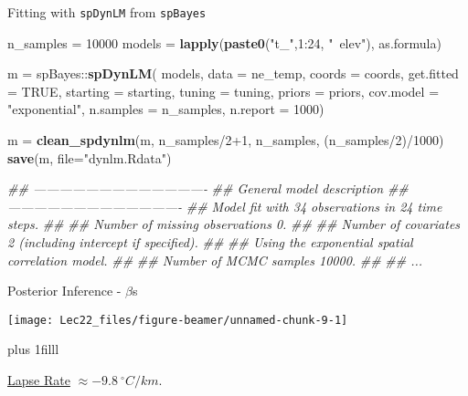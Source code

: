 \documentclass[11pt,ignorenonframetext,]{beamer}
\newenvironment{Shaded}{}{}
\newcommand{\CommentTok}[1]{\textcolor[rgb]{0.38,0.63,0.69}{\textit{#1}}}
\newcommand{\DataTypeTok}[1]{\textcolor[rgb]{0.56,0.13,0.00}{#1}}
\newcommand{\DecValTok}[1]{\textcolor[rgb]{0.25,0.63,0.44}{#1}}
\newcommand{\KeywordTok}[1]{\textcolor[rgb]{0.00,0.44,0.13}{\textbf{#1}}}
\newcommand{\NormalTok}[1]{#1}
\newcommand{\OperatorTok}[1]{\textcolor[rgb]{0.40,0.40,0.40}{#1}}
\newcommand{\OtherTok}[1]{\textcolor[rgb]{0.00,0.44,0.13}{#1}}
\newcommand{\StringTok}[1]{\textcolor[rgb]{0.25,0.44,0.63}{#1}}
\let\oldShaded\Shaded
\let\endoldShaded\endShaded
\renewenvironment{Shaded}{\footnotesize\begin{spacing}{0.9}\oldShaded}{\endoldShaded\end{spacing}}
\let\oldverbatim\verbatim
\let\endoldverbatim\endverbatim
\newcommand{\scriptoutput}{
  \renewenvironment{Shaded}{\scriptsize\begin{spacing}{0.9}\oldShaded}{\endoldShaded\end{spacing}}
  \renewenvironment{verbatim}{\scriptsize\begin{spacing}{0.9}\oldverbatim}{\endoldverbatim\end{spacing}}
}
\newcommand{\vvfill}{\vskip0pt plus 1filll}
\begin{document}
\begin{frame}[fragile]{Fitting with \texttt{spDynLM} from
\texttt{spBayes}}
\protect\hypertarget{fitting-with-spdynlm-from-spbayes}{}

\scriptoutput

\begin{Shaded}
\begin{Highlighting}[]
\NormalTok{n_samples =}\StringTok{ }\DecValTok{10000}
\NormalTok{models =}\StringTok{ }\KeywordTok{lapply}\NormalTok{(}\KeywordTok{paste0}\NormalTok{(}\StringTok{"t_"}\NormalTok{,}\DecValTok{1}\OperatorTok{:}\DecValTok{24}\NormalTok{, }\StringTok{"~elev"}\NormalTok{), as.formula)}

\NormalTok{m =}\StringTok{ }\NormalTok{spBayes}\OperatorTok{::}\KeywordTok{spDynLM}\NormalTok{(}
\NormalTok{  models, }\DataTypeTok{data =}\NormalTok{ ne_temp, }\DataTypeTok{coords =}\NormalTok{ coords, }\DataTypeTok{get.fitted =} \OtherTok{TRUE}\NormalTok{,}
  \DataTypeTok{starting =}\NormalTok{ starting, }\DataTypeTok{tuning =}\NormalTok{ tuning, }\DataTypeTok{priors =}\NormalTok{ priors,}
  \DataTypeTok{cov.model =} \StringTok{"exponential"}\NormalTok{, }\DataTypeTok{n.samples =}\NormalTok{ n_samples, }\DataTypeTok{n.report =} \DecValTok{1000}\NormalTok{)}

\NormalTok{m =}\StringTok{ }\KeywordTok{clean_spdynlm}\NormalTok{(m, n_samples}\OperatorTok{/}\DecValTok{2}\OperatorTok{+}\DecValTok{1}\NormalTok{, n_samples, (n_samples}\OperatorTok{/}\DecValTok{2}\NormalTok{)}\OperatorTok{/}\DecValTok{1000}\NormalTok{)}
\KeywordTok{save}\NormalTok{(m, }\DataTypeTok{file=}\StringTok{"dynlm.Rdata"}\NormalTok{)}

\CommentTok{##  ----------------------------------------}
\CommentTok{##      General model description}
\CommentTok{##  ----------------------------------------}
\CommentTok{##  Model fit with 34 observations in 24 time steps.}
\CommentTok{##  }
\CommentTok{##  Number of missing observations 0.}
\CommentTok{##  }
\CommentTok{##  Number of covariates 2 (including intercept if specified).}
\CommentTok{##  }
\CommentTok{##  Using the exponential spatial correlation model.}
\CommentTok{##  }
\CommentTok{##  Number of MCMC samples 10000.}
\CommentTok{##}
\CommentTok{##  ...}
\end{Highlighting}
\end{Shaded}

\end{frame}

\begin{frame}{Posterior Inference - \(\beta\)s}
\protect\hypertarget{posterior-inference---betas}{}

\vspace{4mm}

\begin{center}\texttt{[image: Lec22\_files/figure-beamer/unnamed-chunk-9-1]} \end{center}

\vvfill

\href{https://en.wikipedia.org/wiki/Lapse_rate}{Lapse Rate}
\(\approx -9.8~^\circ C/km\).

\end{frame}
\end{document}
